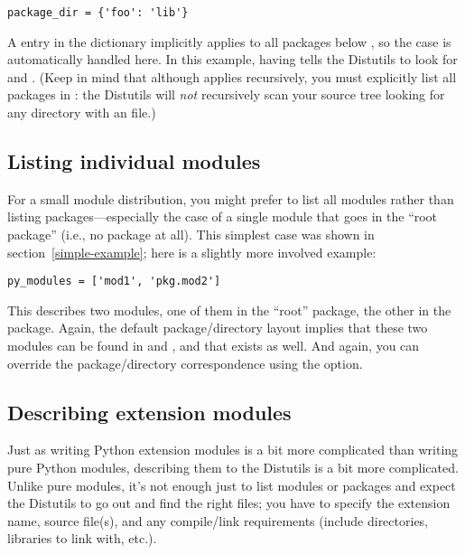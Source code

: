 \documentclass{howto}
\begin{document}
\begin{verbatim}
package_dir = {'foo': 'lib'}
\end{verbatim}

A  entry in the 
dictionary implicitly applies to all packages below , so
the  case is automatically handled here.  In this
example, having  tells the Distutils
to look for  and
.  (Keep in mind that although
 applies recursively, you must explicitly list all
packages in : the Distutils will \emph{not} recursively
scan your source tree looking for any directory with an
 file.)


\subsection{Listing individual modules}
\label{listing-modules}

For a small module distribution, you might prefer to list all modules
rather than listing packages---especially the case of a single module
that goes in the ``root package'' (i.e., no package at all).  This
simplest case was shown in section~\ref{simple-example}; here is a
slightly more involved example:

\begin{verbatim}
py_modules = ['mod1', 'pkg.mod2']
\end{verbatim}

This describes two modules, one of them in the ``root'' package, the
other in the  package.  Again, the default package/directory
layout implies that these two modules can be found in  and
, and that  exists as well.
And again, you can override the package/directory correspondence using
the  option.


\subsection{Describing extension modules}
\label{describing-extensions}

Just as writing Python extension modules is a bit more complicated than
writing pure Python modules, describing them to the Distutils is a bit
more complicated.  Unlike pure modules, it's not enough just to list
modules or packages and expect the Distutils to go out and find the
right files; you have to specify the extension name, source file(s), and
any compile/link requirements (include directories, libraries to link
with, etc.).
\end{document}
